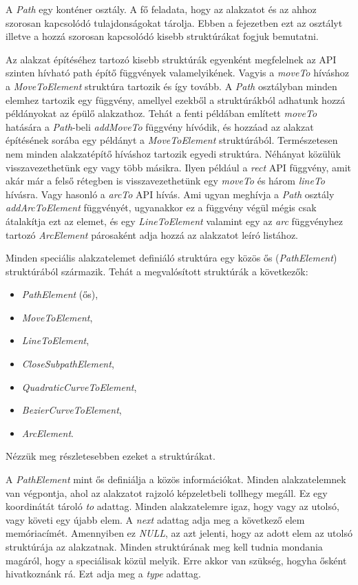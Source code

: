 \documentclass[12pt]{report}
\theoremstyle{definition}
\newcommand{\func}[1]{{\textsl{#1}}}
\begin{document}
A \func{Path} egy konténer osztály. A fő feladata, hogy az alakzatot és az
ahhoz szorosan kapcsolódó tulajdonságokat tárolja. Ebben a fejezetben ezt az
osztályt illetve a hozzá szorosan kapcsolódó kisebb struktúrákat fogjuk
bemutatni.

Az alakzat építéséhez tartozó kisebb struktúrák egyenként megfelelnek az API
szinten hívható path építő függvények valamelyikének. Vagyis a \func{moveTo}
híváshoz a \func{MoveToElement} struktúra tartozik és így tovább. A \func{Path}
osztályban minden elemhez tartozik egy függvény, amellyel ezekből a
struktúrákból adhatunk hozzá példányokat az épülő alakzathoz. Tehát a fenti
példában említett \func{moveTo} hatására a \func{Path}-beli \func{addMoveTo}
függvény hívódik, és hozzáad az alakzat építésének sorába egy példányt a
\func{MoveToElement} struktúrából. Természetesen nem minden alakzatépítő
híváshoz tartozik egyedi struktúra. Néhányat közülük visszavezethetünk egy vagy
több másikra. Ilyen például a \func{rect} API függvény, amit akár már a felső
rétegben is visszavezethetünk egy \func{moveTo} és három \func{lineTo} hívásra.
Vagy hasonló a \func{arcTo} API hívás. Ami ugyan meghívja a \func{Path} osztály
\func{addArcToElement} függvényét, ugyanakkor ez a függvény végül mégis csak
átalakítja ezt az elemet, és egy \func{LineToElement} valamint egy az
\func{arc} függvényhez tartozó \func{ArcElement} párosaként adja hozzá az
alakzatot leíró listához.

Minden speciális alakzatelemet definiáló struktúra egy közös ős
(\func{PathElement}) struktúrából származik. Tehát a megvalósított struktúrák a
következők:
  \begin{itemize}
    \item \func{PathElement} (ős),
    \item \func{MoveToElement},
    \item \func{LineToElement},
    \item \func{CloseSubpathElement},
    \item \func{QuadraticCurveToElement},
    \item \func{BezierCurveToElement},
    \item \func{ArcElement}.
  \end{itemize}
Nézzük meg részletesebben ezeket a struktúrákat.

A \func{PathElement} mint ős definiálja a közös információkat. Minden
alakzatelemnek van végpontja, ahol az alakzatot rajzoló képzeletbeli tollhegy
megáll. Ez egy koordinátát tároló \func{to} adattag. Minden alakzatelemre igaz,
hogy vagy az utolsó, vagy követi egy újabb elem. A \func{next} adattag adja meg
a következő elem memóriacímét. Amennyiben ez \func{NULL}, az azt jelenti, hogy
az adott elem az utolsó struktúrája az alakzatnak. Minden struktúrának meg kell
tudnia mondania magáról, hogy a speciálisak közül melyik. Erre akkor van
szükség, hogyha ősként hivatkoznánk rá. Ezt adja meg a \func{type} adattag.
\end{document}
